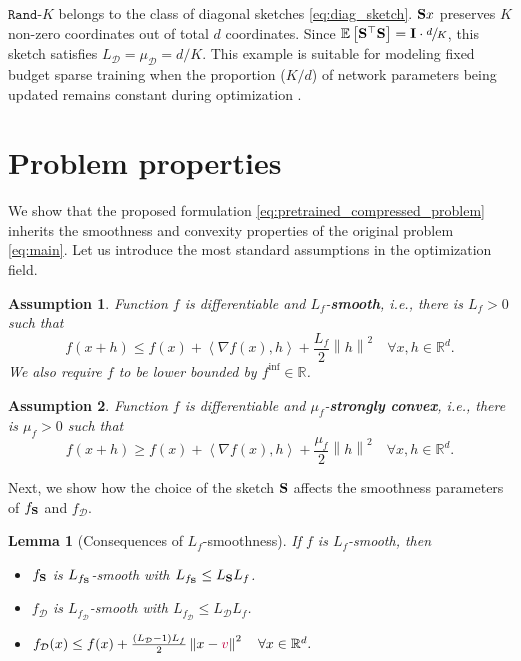 \documentclass{article}
\newcommand{\rnd}[1]{{\texttt{Rand-}}#1}
\newcommand{\ve}[2]{\left\langle #1 ,  #2 \right\rangle}
\newcommand{\shift}{{\color{purple}s}}
\newcommand{\bb}{\mathbb}
\newcommand{\R}{\bb R}
\newcommand{\norm}[1]{\left\| #1 \right\|}
\newcommand{\mI}{\mathbf{I}}
\newtheorem{assumption}{Assumption}
\newtheorem{lemma}{Lemma}
\theoremstyle{plain}
\newcommand{\tf}{f_{\mathcal{D}}}
\renewcommand{\shift}{{\color{purple}v}}
\newcommand{\mS}{{\bf S}}
\theoremstyle{plain}
\theoremstyle{definition}
\theoremstyle{remark}
\begin{document}
$\rnd{\text{$K$}}$ belongs to the class of diagonal sketches \eqref{eq:diag_sketch}. $\mS x$ preserves $K$ non-zero coordinates out of total $d$ coordinates. Since $\mathbb{E}\left[\mS^\top\mS\right] = \mI \cdot \sfrac{d}{K}$, this sketch satisfies $L_{\mathcal{D}} = \mu_{\mathcal{D}} = d/K$. This example is suitable for modeling fixed budget sparse training when the proportion ($K/d$) of network parameters being updated remains constant during optimization \citep{mocanu2018scalable, evci2020rigging}.

\section{Problem properties} \label{sec:properties}
We show that the proposed formulation \eqref{eq:pretrained_compressed_problem} inherits the smoothness and convexity properties of the original problem \eqref{eq:main}. Let us introduce the most standard assumptions in the optimization field.
\begin{assumption} \label{ass:l_f_smooth}
	Function $f$ is differentiable and $L_f$-\textbf{smooth}, i.e., there is $L_f>0$ such that
	\[f(x+h) \leq f(x) + \ve{\nabla f(x)}{h} + \frac{L_f}{2}\norm{h}^2 \quad  \forall x, h \in \R^d.\]
	We also require $f$ to be lower bounded by $f^{\inf} \in \mathbb{R}$.
\end{assumption}
\begin{assumption} \label{ass:mu_f-convex}
	Function $f$ is differentiable and $\mu_f$-\textbf{strongly convex}, i.e., there is $\mu_f>0$ such that
	\[f(x+h) \geq f(x) + \ve{\nabla f(x)}{h} + \frac{\mu_f}{2}\norm{h}^2 \quad  \forall x, h \in \R^d.\]
\end{assumption}

Next, we show how the choice of the sketch $\mS$ affects the smoothness parameters of $f_{\mS}$ and $\tf$.

\begin{lemma}[Consequences of $L_f$-smoothness] \label{lemma:smoothness}
	If $f$ is $L_f$-smooth, then
	\begin{itemize}
		\item[(i)] $f_{\mS}$ is $L_{f_\mS}$-smooth with $L_{f_\mS} \leq L_{\mS} L_f $.

		\item[(ii)] $\tf$ is $L_{\tf}$-smooth with $L_{\tf}\leq L_{\mathcal{D}} L_f $.

		\item[(iii)] $\tf(x) \leq f(x) + \frac{(L_{\mathcal{D}}-1) L_f}{2} \norm{x-\shift}^2 \quad \forall x\in \R^d.$
	\end{itemize}
\end{lemma}
\end{document}
